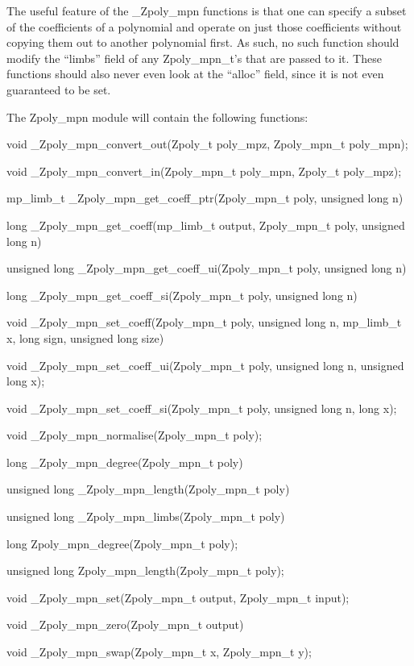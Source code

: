 \documentclass[a4paper,10pt]{article}
\begin{document}
The useful feature of the \_Zpoly\_mpn functions is that one can specify a subset of the coefficients of a polynomial and operate on just those coefficients without copying them out to another polynomial first. As such, no such function should modify the ``limbs'' field of any Zpoly\_mpn\_t's that are passed to it. These functions should also never even look at the ``alloc'' field, since it is not even guaranteed to be set. 

The Zpoly\_mpn module will contain the following functions:

\vspace{5mm}

void \_Zpoly\_mpn\_convert\_out(Zpoly\_t poly\_mpz, Zpoly\_mpn\_t poly\_mpn);

void \_Zpoly\_mpn\_convert\_in(Zpoly\_mpn\_t poly\_mpn, Zpoly\_t poly\_mpz);
                     
mp\_limb\_t \* \_Zpoly\_mpn\_get\_coeff\_ptr(Zpoly\_mpn\_t poly, unsigned long n)

long \_Zpoly\_mpn\_get\_coeff(mp\_limb\_t \* output, Zpoly\_mpn\_t poly, unsigned long n)

unsigned long \_Zpoly\_mpn\_get\_coeff\_ui(Zpoly\_mpn\_t poly, unsigned long n)

long \_Zpoly\_mpn\_get\_coeff\_si(Zpoly\_mpn\_t poly, unsigned long n)

void \_Zpoly\_mpn\_set\_coeff(Zpoly\_mpn\_t poly, unsigned long n, mp\_limb\_t \* x, long sign, unsigned long size)

void \_Zpoly\_mpn\_set\_coeff\_ui(Zpoly\_mpn\_t poly, unsigned long n, unsigned long x);

void \_Zpoly\_mpn\_set\_coeff\_si(Zpoly\_mpn\_t poly, unsigned long n, long x);

void \_Zpoly\_mpn\_normalise(Zpoly\_mpn\_t poly);

long \_Zpoly\_mpn\_degree(Zpoly\_mpn\_t poly)

unsigned long \_Zpoly\_mpn\_length(Zpoly\_mpn\_t poly)

unsigned long \_Zpoly\_mpn\_limbs(Zpoly\_mpn\_t poly)

long Zpoly\_mpn\_degree(Zpoly\_mpn\_t poly);

unsigned long Zpoly\_mpn\_length(Zpoly\_mpn\_t poly);

void \_Zpoly\_mpn\_set(Zpoly\_mpn\_t output, Zpoly\_mpn\_t input);

void \_Zpoly\_mpn\_zero(Zpoly\_mpn\_t output)

void \_Zpoly\_mpn\_swap(Zpoly\_mpn\_t x, Zpoly\_mpn\_t y);
\end{document}
